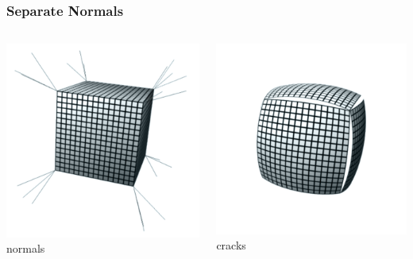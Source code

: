 \begin{frame}\frametitle{Separate Normals}
	\begin{columns}
		\begin{column}{0.4\textwidth}
		\begin{center}
				\includegraphics[width=\textwidth]{img/2_mesh/cracksNormals.png}
				\small{normals}
			\end{center}	
		\end{column}
		\begin{column}{0.4\textwidth}
		\begin{center}
				\includegraphics[width=\textwidth]{img/2_mesh/cracks.png}
				\small{cracks}
			\end{center}	
		\end{column}
	\end{columns}
\end{frame}
